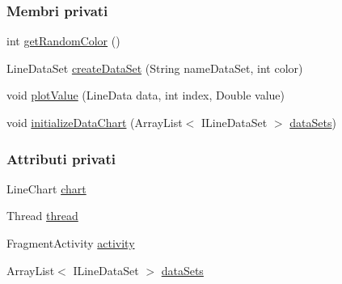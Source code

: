 \subsubsection*{Membri privati}
\begin{DoxyCompactItemize}
\item 
int \hyperlink{classit_1_1unibo_1_1torsello_1_1bluetoothpositioning_1_1util_1_1ChartUtil_ac7dc0a849201a4a3c932fd525435b397_ac7dc0a849201a4a3c932fd525435b397}{get\+Random\+Color} ()
\item 
Line\+Data\+Set \hyperlink{classit_1_1unibo_1_1torsello_1_1bluetoothpositioning_1_1util_1_1ChartUtil_a7e24ac167fd4955090e04024b11c6c31_a7e24ac167fd4955090e04024b11c6c31}{create\+Data\+Set} (String name\+Data\+Set, int color)
\item 
void \hyperlink{classit_1_1unibo_1_1torsello_1_1bluetoothpositioning_1_1util_1_1ChartUtil_a86398d4aca978fbfc10c71039191635e_a86398d4aca978fbfc10c71039191635e}{plot\+Value} (Line\+Data data, int index, Double value)
\item 
void \hyperlink{classit_1_1unibo_1_1torsello_1_1bluetoothpositioning_1_1util_1_1ChartUtil_a3393d9aa353849188c02a63d64f2dd2d_a3393d9aa353849188c02a63d64f2dd2d}{initialize\+Data\+Chart} (Array\+List$<$ I\+Line\+Data\+Set $>$ \hyperlink{classit_1_1unibo_1_1torsello_1_1bluetoothpositioning_1_1util_1_1ChartUtil_aa98bcaa2d5ba444b91cdc029768d380a_aa98bcaa2d5ba444b91cdc029768d380a}{data\+Sets})
\end{DoxyCompactItemize}
\subsubsection*{Attributi privati}
\begin{DoxyCompactItemize}
\item 
Line\+Chart \hyperlink{classit_1_1unibo_1_1torsello_1_1bluetoothpositioning_1_1util_1_1ChartUtil_a6c34176fdfb85bac1d3aa1529b49ad5f_a6c34176fdfb85bac1d3aa1529b49ad5f}{chart}
\item 
Thread \hyperlink{classit_1_1unibo_1_1torsello_1_1bluetoothpositioning_1_1util_1_1ChartUtil_ac73af861c9ca49e226fe1218cef6c572_ac73af861c9ca49e226fe1218cef6c572}{thread}
\item 
Fragment\+Activity \hyperlink{classit_1_1unibo_1_1torsello_1_1bluetoothpositioning_1_1util_1_1ChartUtil_acf9c1988f7aaacc3f3354ac7e9eeef6a_acf9c1988f7aaacc3f3354ac7e9eeef6a}{activity}
\item 
Array\+List$<$ I\+Line\+Data\+Set $>$ \hyperlink{classit_1_1unibo_1_1torsello_1_1bluetoothpositioning_1_1util_1_1ChartUtil_aa98bcaa2d5ba444b91cdc029768d380a_aa98bcaa2d5ba444b91cdc029768d380a}{data\+Sets}
\end{DoxyCompactItemize}


